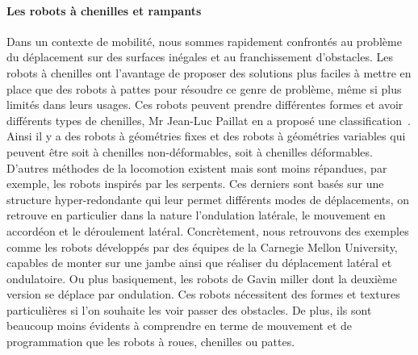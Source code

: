             \paragraph{Les robots à chenilles et rampants}
                Dans un contexte de mobilité, nous sommes rapidement confrontés au problème du déplacement sur des surfaces inégales et au franchissement d’obstacles. Les robots à chenilles ont l’avantage de proposer des solutions plus faciles à mettre en place que des robots à pattes pour résoudre ce genre de problème, même si plus limités dans leurs usages.
	            Ces robots peuvent prendre différentes formes et avoir différents types de chenilles, Mr Jean-Luc Paillat en a proposé une classification~. Ainsi il y a des robots à géométries fixes et des robots à géométries variables qui peuvent être soit à chenilles non-déformables, soit à chenilles déformables.
	            D’autres méthodes de la locomotion existent mais sont moins répandues, par exemple, les robots inspirés par les serpents. Ces derniers sont basés sur une structure hyper-redondante qui leur permet différents modes de déplacements, on retrouve en particulier dans la nature l'ondulation latérale, le mouvement en accordéon et le déroulement latéral.
                Concrètement, nous retrouvons des exemples comme les robots  développés par des équipes de la Carnegie Mellon University, capables de monter sur une jambe ainsi que réaliser du déplacement latéral et ondulatoire.
                Ou plus basiquement, les robots de Gavin miller dont la deuxième version se déplace par ondulation.
                Ces robots nécessitent des formes et textures particulières si l’on souhaite les voir passer des obstacles. De plus, ils sont beaucoup moins évidents à comprendre en terme de mouvement et de programmation que les robots à roues, chenilles ou pattes.
